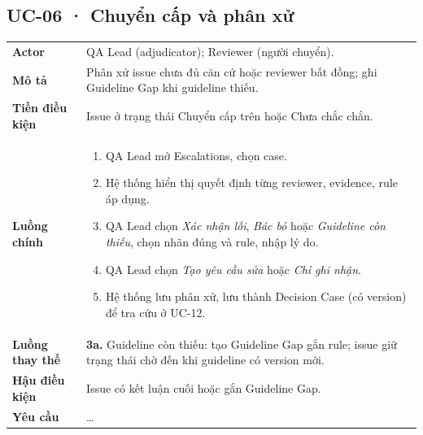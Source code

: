 \subsection*{UC-06 · Chuyển cấp và phân xử}
\begin{xltabular}{\linewidth}{@{}>{\bfseries}L{3.2cm}Y@{}}
\toprule
Actor & QA Lead (adjudicator); Reviewer (người chuyển).\\
Mô tả & Phân xử issue chưa đủ căn cứ hoặc reviewer bất đồng; ghi Guideline Gap khi guideline thiếu.\\
Tiền điều kiện & Issue ở trạng thái Chuyển cấp trên hoặc Chưa chắc chắn.\\
Luồng chính &
\begin{enumerate}[nosep]
  \item QA Lead mở Escalations, chọn case.
  \item Hệ thống hiển thị quyết định từng reviewer, evidence, rule áp dụng.
  \item QA Lead chọn \emph{Xác nhận lỗi}, \emph{Bác bỏ} hoặc \emph{Guideline còn thiếu}, chọn nhãn đúng và rule, nhập lý do.
  \item QA Lead chọn \emph{Tạo yêu cầu sửa} hoặc \emph{Chỉ ghi nhận}.
  \item Hệ thống lưu phân xử, lưu thành Decision Case (có version) để tra cứu ở UC-12.
\end{enumerate}\\
Luồng thay thế & \textbf{3a.} Guideline còn thiếu: tạo Guideline Gap gắn rule; issue giữ trạng thái chờ đến khi guideline có version mới.\\
Hậu điều kiện & Issue có kết luận cuối hoặc gắn Guideline Gap.\\
Yêu cầu & …\\
\bottomrule
\end{xltabular}

